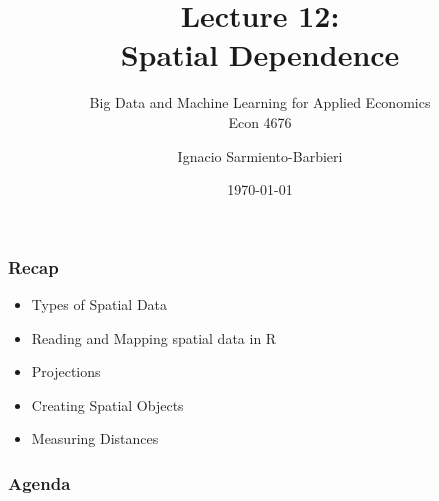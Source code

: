 \documentclass[
  shownotes,
  xcolor={svgnames},
  hyperref={colorlinks,citecolor=DarkBlue,linkcolor=DarkRed,urlcolor=DarkBlue}
  ]{beamer}
\begin{document}
\title[Lecture 12]{Lecture 12: \\ Spatial Dependence}
\subtitle{Big Data and Machine Learning for Applied Economics \\ Econ 4676}
\date{\today}

\author[Sarmiento-Barbieri]{Ignacio Sarmiento-Barbieri}


\begin{frame}[noframenumbering]
\maketitle
\end{frame}



\begin{frame}
\frametitle{Recap }

  \begin{itemize} 
      \item Types of Spatial Data
      \medskip
      \item Reading and Mapping spatial data in R
      \medskip
      \item Projections
      \medskip
      \item Creating Spatial Objects
      \medskip
      \item Measuring Distances
  \end{itemize}

\end{frame}


\begin{frame}
\frametitle{Agenda}

\tableofcontents

\end{frame}




\end{document}
